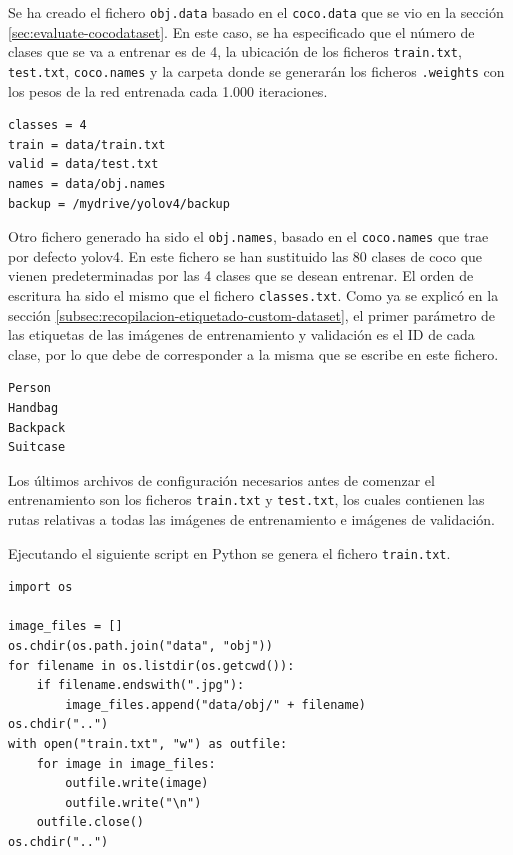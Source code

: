 Se ha creado el fichero \texttt{obj.data} basado en el \texttt{coco.data} que se vio en la sección \ref{sec:evaluate-cocodataset}. En este caso, se ha especificado que el número de clases que se va a entrenar es de 4, la ubicación de los ficheros \texttt{train.txt}, \texttt{test.txt}, \texttt{coco.names} y la carpeta donde se generarán los ficheros \texttt{.weights} con los pesos de la red entrenada cada 1.000 iteraciones.

\vspace{0.5cm}
\begin{lstlisting}[language=iPython,caption=Fichero obj.data,captionpos=b,label={lst:obj-data-file}]
classes = 4
train = data/train.txt
valid = data/test.txt
names = data/obj.names
backup = /mydrive/yolov4/backup
\end{lstlisting}

Otro fichero generado ha sido el \texttt{obj.names}, basado en el \texttt{coco.names} que trae por defecto \gls{yolov4}. En este fichero se han sustituido las 80 clases de \gls{coco} que vienen predeterminadas por las 4 clases que se desean entrenar. El orden de escritura ha sido el mismo que el fichero \texttt{classes.txt}. Como ya se explicó en la sección \ref{subsec:recopilacion-etiquetado-custom-dataset}, el primer parámetro de las etiquetas de las imágenes de entrenamiento y validación es el ID de cada clase, por lo que debe de corresponder a la misma que se escribe en este fichero.

\vspace{0.5cm}
\begin{lstlisting}[language=iPython,caption=Fichero obj.names,captionpos=b,label={lst:obj-names-file}]
Person
Handbag
Backpack
Suitcase
\end{lstlisting}

Los últimos archivos de configuración necesarios antes de comenzar el entrenamiento son los ficheros \texttt{train.txt} y \texttt{test.txt}, los cuales contienen las rutas relativas a todas las imágenes de entrenamiento e imágenes de validación.

Ejecutando el siguiente script en Python se genera el fichero \texttt{train.txt}.

\vspace{0.5cm}
\begin{lstlisting}[language=iPython,caption=Generación del fichero train.txt,captionpos=b,label={lst:train-generate}]
import os

image_files = []
os.chdir(os.path.join("data", "obj"))
for filename in os.listdir(os.getcwd()):
    if filename.endswith(".jpg"):
        image_files.append("data/obj/" + filename)
os.chdir("..")
with open("train.txt", "w") as outfile:
    for image in image_files:
        outfile.write(image)
        outfile.write("\n")
    outfile.close()
os.chdir("..")
\end{lstlisting}

